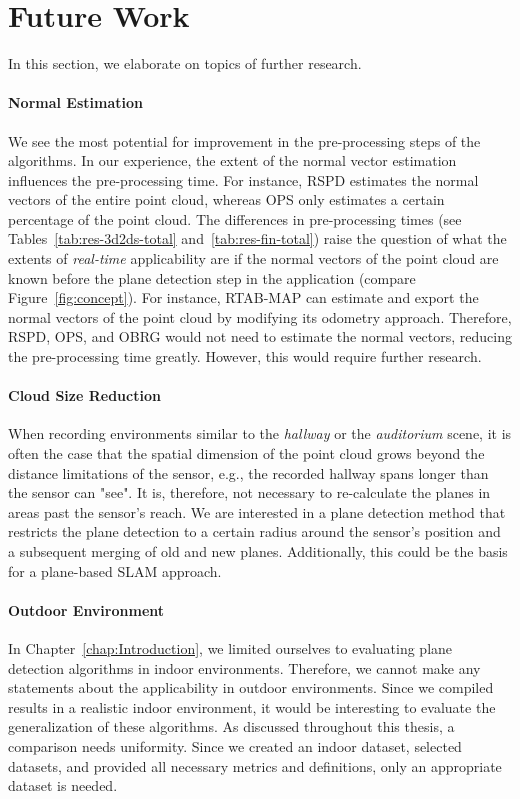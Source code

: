 \documentclass[main.tex]{subfiles}
\begin{document}
\section{Future Work}
In this section, we elaborate on topics of further research.


\paragraph{Normal Estimation}
We see the most potential for improvement in the pre-processing steps of the algorithms. In our experience, the extent of the normal vector estimation influences the pre-processing time. For instance, RSPD estimates the normal vectors of the entire point cloud, whereas OPS only estimates a certain percentage of the point cloud. The differences in pre-processing times (see Tables~\ref{tab:res-3d2ds-total} and~\ref{tab:res-fin-total}) raise the question of what the extents of \textit{real-time} applicability are if the normal vectors of the point cloud are known before the plane detection step in the application (compare Figure~\ref{fig:concept}). For instance, RTAB-MAP can estimate and export the normal vectors of the point cloud by modifying its odometry approach. Therefore, RSPD, OPS, and OBRG would not need to estimate the normal vectors, reducing the pre-processing time greatly. However, this would require further research.

\clearpage
\paragraph{Cloud Size Reduction}
When recording environments similar to the \textit{hallway} or the \textit{auditorium} scene, it is often the case that the spatial dimension of the point cloud grows beyond the distance limitations of the sensor, e.g., the recorded hallway spans longer than the sensor can "see". It is, therefore, not necessary to re-calculate the planes in areas past the sensor's reach. We are interested in a plane detection method that restricts the plane detection to a certain radius around the sensor's position and a subsequent merging of old and new planes. Additionally, this could be the basis for a plane-based SLAM approach.

\paragraph{Outdoor Environment}
In Chapter~\ref{chap:Introduction}, we limited ourselves to evaluating plane detection algorithms in indoor environments. Therefore, we cannot make any statements about the applicability in outdoor environments. Since we compiled results in a realistic indoor environment, it would be interesting to evaluate the generalization of these algorithms. As discussed throughout this thesis, a comparison needs uniformity. Since we created an indoor dataset, selected datasets, and provided all necessary metrics and definitions, only an appropriate dataset is needed.
\end{document}
